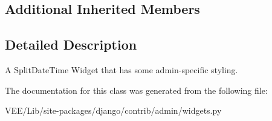 \subsection*{Additional Inherited Members}


\subsection{Detailed Description}
\begin{DoxyVerb}A SplitDateTime Widget that has some admin-specific styling.
\end{DoxyVerb}
 

The documentation for this class was generated from the following file\+:\begin{DoxyCompactItemize}
\item 
V\+E\+E/\+Lib/site-\/packages/django/contrib/admin/widgets.\+py\end{DoxyCompactItemize}
